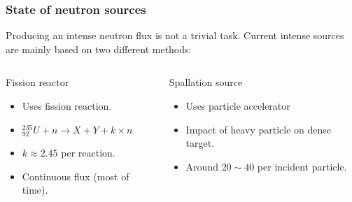 \begin{frame}
  \frametitle{State of neutron sources}
  Producing an intense neutron flux is not a trivial task.
  Current intense sources are mainly based on two different methods:
  \begin{columns}[T]
    \begin{column}{0.45\textwidth}
      \begin{block}{Fission reactor}
        \begin{itemize}
          \item Uses fission reaction.
          \item $_{92}^{235}U + n \rightarrow X + Y + k \times n$
          \item $k\approx2.45$ per reaction.
          \item Continuous flux (most of time).
        \end{itemize}
      \end{block}
      \vfill
    \end{column}
    \begin{column}{0.45\textwidth}
      \begin{block}{Spallation source}
        \begin{itemize}
          \item Uses particle accelerator
          \item Impact of heavy particle on dense target.
          \item Around $20 \sim 40$ per incident particle.
        \end{itemize}
      \end{block}
      \vfill
    \end{column}
  \end{columns}

\end{frame}

